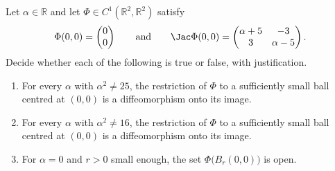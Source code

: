 \begin{exercise}
\label{ex:local_diffeo_parameter_alpha}
Let $\alpha \in \mathbb{R}$ and let $\Phi \in C^1(\mathbb{R}^2,\mathbb{R}^2)$ satisfy
\[\Phi(0,0) = \begin{pmatrix} 0 \\ 0 \end{pmatrix} \qquad\text{and}\qquad
  \Jac\Phi(0,0) = \begin{pmatrix} \alpha+5 & -3 \\ 3 & \alpha-5 \end{pmatrix}.\]
Decide whether each of the following is true or false, with justification.
\begin{enumerate}[label=\textbf{(\alph*)}]
  \item For every $\alpha$ with $\alpha^2 \neq 25$, the restriction of $\Phi$ to a sufficiently
    small ball centred at $(0,0)$ is a diffeomorphism onto its image.
  \item For every $\alpha$ with $\alpha^2 \neq 16$, the restriction of $\Phi$ to a sufficiently
    small ball centred at $(0,0)$ is a diffeomorphism onto its image.
  \item For $\alpha = 0$ and $r > 0$ small enough, the set $\Phi\big(B_r(0,0)\big)$ is open.
\end{enumerate}
\end{exercise}

